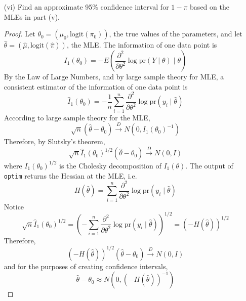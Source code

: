 \documentclass[letterpaper, 12pt]{article}
\newcommand{\pr}{\text{pr}}
\newcommand{\sion}{\sum_{i=1}^n}
\begin{document}
\begin{enumerate}
\begin{enumerate}
\item[(vi)]
Find an approximate 95\% confidence interval for $1-\pi$ based on the MLEs
in part (v). 
\begin{proof}
Let $\theta_0 = (\mu_0, \text{logit}(\pi_0))$, the true values of the parameters, and let $\hat{\theta} = (\hat{\mu}, \text{logit}(\hat{\pi}))$, the MLE.
The information of one data point is 
\[
I_1(\theta_0) = -E\left(\frac{\partial^2}{\partial \theta^2} \log \pr(Y \mid \theta) \mid \theta\right)
\]
By the Law of Large Numbers, and by large sample theory for MLE, a consistent estimator of the information of one data point is
\[
\hat{I}_1(\theta_0) = -\frac{1}{n}\sion \frac{\partial^2}{\partial \theta^2} \log \pr(y_i \mid \hat{\theta})
\]
According to large sample theory for the MLE,
\[
\sqrt{n}
\left(
\hat{\theta}
-
\theta_0
\right)
\xrightarrow{D}
N(0, I_1(\theta_0)^{-1})
\]
Therefore, by Slutsky's theorem,
\[
\sqrt{n} \hat{I}_1(\theta_0)^{1/2} (\hat{\theta} - \theta_0)
\xrightarrow{D}
N(0, I)
\]
where $I_1(\theta_0)^{1/2}$ is the Cholesky decomposition of $I_1(\theta)$. 
The output of \texttt{optim} returns the Hessian at the MLE, i.e.
\[
H(\hat{\theta}) = \sion \frac{\partial^2}{\partial \theta^2} \log \pr(y_i \mid \hat{\theta})
\]
Notice 
\[
\sqrt{n} \hat{I}_1(\theta_0)^{1/2} = \left(
-\sion \frac{\partial^2}{\partial \theta^2} \log \pr(y_i \mid \hat{\theta})
\right)^{1/2} = (-H(\hat{\theta}))^{1/2}
\]
Therefore,
\[
(-H(\hat{\theta}))^{1/2}(\hat{\theta} - \theta_0) \xrightarrow{D} N(0,I)
\]
and for the purposes of creating confidence intervals,
\[
\hat{\theta} - \theta_0 \approx N(0, (-H(\hat{\theta}))^{-1})
\]


\end{proof}
\end{enumerate}
\end{enumerate}
\end{document}
